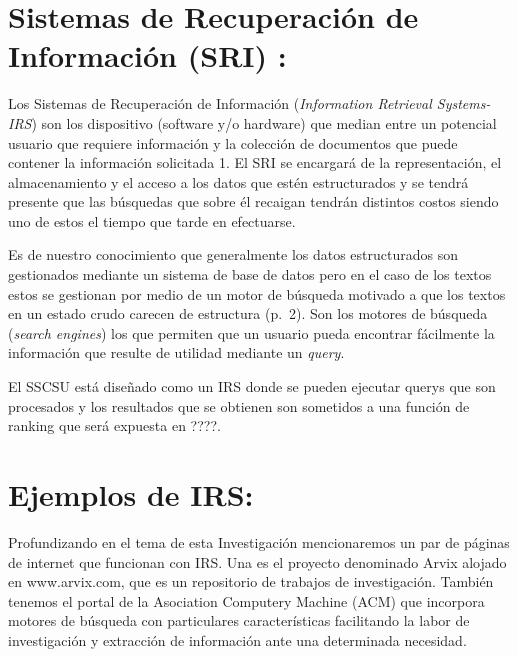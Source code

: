\documentclass[
  10,
  openany]{book}
\begin{document}
\hypertarget{SRI}{%
\section{Sistemas de Recuperación de Información (SRI) :}\label{SRI}}

Los Sistemas de Recuperación de Información (\emph{Information Retrieval Systems-IRS}) son los dispositivo (software y/o hardware) que median entre un potencial usuario que requiere información y la colección de documentos que puede contener la información solicitada \citep{kraft2017} 1. El SRI se encargará de la representación, el almacenamiento y el acceso a los datos que estén estructurados y se tendrá presente que las búsquedas que sobre él recaigan tendrán distintos costos siendo uno de estos el tiempo que tarde en efectuarse.

Es de nuestro conocimiento que generalmente los datos estructurados son gestionados mediante un sistema de base de datos pero en el caso de los textos estos se gestionan por medio de un motor de búsqueda motivado a que los textos en un estado crudo carecen de estructura \citep{miningt2012} (p.~2). Son los motores de búsqueda (\emph{search engines}) los que permiten que un usuario pueda encontrar fácilmente la información que resulte de utilidad mediante un \emph{query}.

El SSCSU está diseñado como un IRS donde se pueden ejecutar querys que son procesados y los resultados que se obtienen son sometidos a una función de ranking que será expuesta en ????.

\hypertarget{ejemplos-de-irs}{%
\section{Ejemplos de IRS:}\label{ejemplos-de-irs}}

Profundizando en el tema de esta Investigación mencionaremos un par de páginas de internet que funcionan con IRS. Una es el proyecto denominado Arvix alojado en www.arvix.com, que es un repositorio de trabajos de investigación. También tenemos el portal de la Asociation Computery Machine (ACM) que incorpora motores de búsqueda con particulares características facilitando la labor de investigación y extracción de información ante una determinada necesidad.
\end{document}
